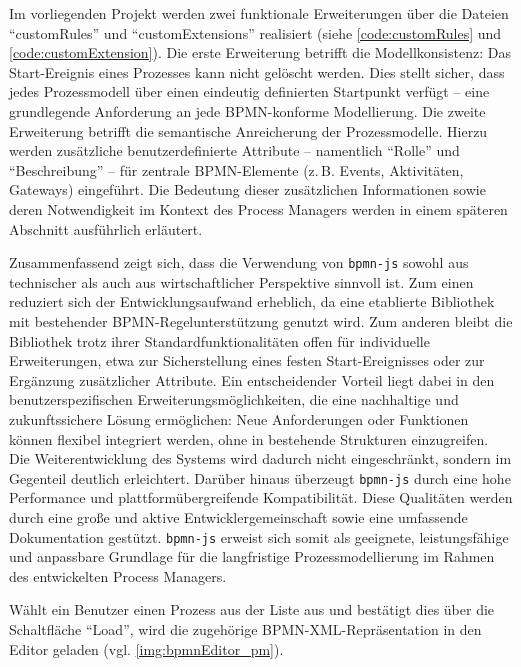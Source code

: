 Im vorliegenden Projekt werden zwei funktionale Erweiterungen über die Dateien \enquote{customRules} und \enquote{customExtensions} realisiert (siehe \autoref{code:customRules} und \autoref{code:customExtension}). Die erste Erweiterung betrifft die Modellkonsistenz: Das Start-Ereignis eines Prozesses kann nicht gelöscht werden. Dies stellt sicher, dass jedes Prozessmodell über einen eindeutig definierten Startpunkt verfügt – eine grundlegende Anforderung an jede BPMN-konforme Modellierung. Die zweite Erweiterung betrifft die semantische Anreicherung der Prozessmodelle. Hierzu werden zusätzliche benutzerdefinierte Attribute – namentlich \enquote{Rolle} und \enquote{Beschreibung} – für zentrale BPMN-Elemente (z.\,B. Events, Aktivitäten, Gateways) eingeführt. Die Bedeutung dieser zusätzlichen Informationen sowie deren Notwendigkeit im Kontext des Process Managers werden in einem späteren Abschnitt ausführlich erläutert.

Zusammenfassend zeigt sich, dass die Verwendung von \texttt{bpmn-js} sowohl aus technischer als auch aus wirtschaftlicher Perspektive sinnvoll ist. Zum einen reduziert sich der Entwicklungsaufwand erheblich, da eine etablierte Bibliothek mit bestehender BPMN-Regelunterstützung genutzt wird. Zum anderen bleibt die Bibliothek trotz ihrer Standardfunktionalitäten offen für individuelle Erweiterungen, etwa zur Sicherstellung eines festen Start-Ereignisses oder zur Ergänzung zusätzlicher Attribute. Ein entscheidender Vorteil liegt dabei in den benutzerspezifischen Erweiterungsmöglichkeiten, die eine nachhaltige und zukunftssichere Lösung ermöglichen: Neue Anforderungen oder Funktionen können flexibel integriert werden, ohne in bestehende Strukturen einzugreifen. Die Weiterentwicklung des Systems wird dadurch nicht eingeschränkt, sondern im Gegenteil deutlich erleichtert. Darüber hinaus überzeugt \texttt{bpmn-js} durch eine hohe Performance und plattformübergreifende Kompatibilität. Diese Qualitäten werden durch eine große und aktive Entwicklergemeinschaft sowie eine umfassende Dokumentation gestützt. \texttt{bpmn-js} erweist sich somit als geeignete, leistungsfähige und anpassbare Grundlage für die langfristige Prozessmodellierung im Rahmen des entwickelten Process Managers.

\newpage
Wählt ein Benutzer einen Prozess aus der Liste aus und bestätigt dies über die Schaltfläche \enquote{Load}, wird die zugehörige BPMN-XML-Repräsentation in den Editor geladen (vgl. \autoref{img:bpmnEditor_pm}).



